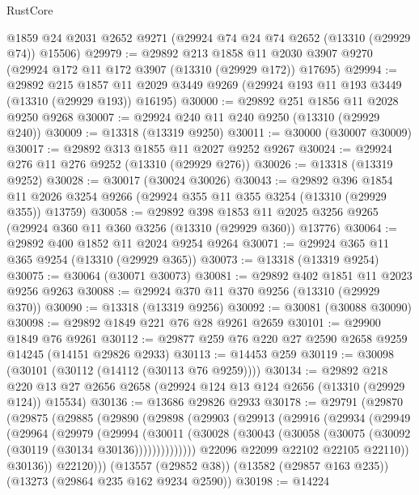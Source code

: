 \begin{lexlean}{RustCore}
\begin{coremodule}
    @1859
    @24
    @2031
    @2652
    @9271
    (@29924 @74 @24 @74 @2652 (@13310 (@29929 @74)) @15506)
@29979 := @29892
    @213
    @1858
    @11
    @2030
    @3907
    @9270
    (@29924 @172 @11 @172 @3907 (@13310 (@29929 @172)) @17695)
@29994 := @29892
    @215
    @1857
    @11
    @2029
    @3449
    @9269
    (@29924 @193 @11 @193 @3449 (@13310 (@29929 @193)) @16195)
@30000 := @29892 @251 @1856 @11 @2028 @9250 @9268
@30007 := @29924 @240 @11 @240 @9250 (@13310 (@29929 @240))
@30009 := @13318 (@13319 @9250)
@30011 := @30000 (@30007 @30009)
@30017 := @29892 @313 @1855 @11 @2027 @9252 @9267
@30024 := @29924 @276 @11 @276 @9252 (@13310 (@29929 @276))
@30026 := @13318 (@13319 @9252)
@30028 := @30017 (@30024 @30026)
@30043 := @29892
    @396
    @1854
    @11
    @2026
    @3254
    @9266
    (@29924 @355 @11 @355 @3254 (@13310 (@29929 @355)) @13759)
@30058 := @29892
    @398
    @1853
    @11
    @2025
    @3256
    @9265
    (@29924 @360 @11 @360 @3256 (@13310 (@29929 @360)) @13776)
@30064 := @29892 @400 @1852 @11 @2024 @9254 @9264
@30071 := @29924 @365 @11 @365 @9254 (@13310 (@29929 @365))
@30073 := @13318 (@13319 @9254)
@30075 := @30064 (@30071 @30073)
@30081 := @29892 @402 @1851 @11 @2023 @9256 @9263
@30088 := @29924 @370 @11 @370 @9256 (@13310 (@29929 @370))
@30090 := @13318 (@13319 @9256)
@30092 := @30081 (@30088 @30090)
@30098 := @29892 @1849 @221 @76 @28 @9261 @2659
@30101 := @29900 @1849 @76 @9261
@30112 := @29877 @259 @76 @220 @27 @2590 @2658 @9259 @14245 (@14151 @29826 @2933)
@30113 := @14453 @259
@30119 := @30098 (@30101 (@30112 (@14112 (@30113 @76 @9259))))
@30134 := @29892
    @218
    @220
    @13
    @27
    @2656
    @2658
    (@29924 @124 @13 @124 @2656 (@13310 (@29929 @124)) @15534)
@30136 := @13686 @29826 @2933
@30178 := @29791
    (@29870
      (@29875
        (@29885
          (@29890
            (@29898
              (@29903
                (@29913
                  (@29916
                    (@29934
                      (@29949
                        (@29964
                          (@29979
                            (@29994
                              (@30011
                                (@30028
                                  (@30043
                                    (@30058 (@30075 (@30092 (@30119 (@30134 @30136))))))))))))))
                  @22096
                  @22099
                  @22102
                  @22105
                  @22110))
              @30136))
          @22120)))
    (@13557 (@29852 @38))
    (@13582 (@29857 @163 @235))
    (@13273 (@29864 @235 @162 @9234 @2590))
@30198 := @14224

\end{coremodule}
\end{lexlean}

